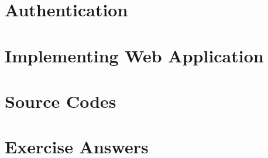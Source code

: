 \documentclass[a4paper,10pt,hidelinks]{book}
\begin{document}
    \chapter{Authentication}\label{ch:authentication}
    \minitoc
    
    
    

    \chapter{Implementing Web Application}\label{ch:implementing-web-application}
    \minitoc
    
    
    
    

    \appendix

    \chapter{Source Codes}\label{ch:source-codes}
    \minitoc
    
    
    

    \chapter{Exercise Answers}\label{ch:exercise-answers}
    \minitoc
    
    
    
    
    
\end{document}

